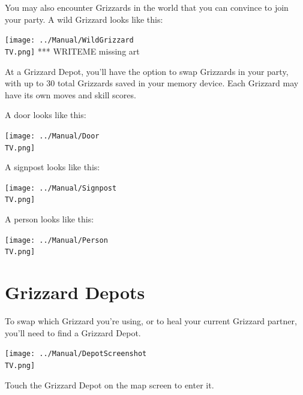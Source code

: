 \documentclass[10pt,twocolumn,openany,article]{memoir}
\newcommand\TV{NTSC}
\newcommand\TV{PAL}
\newcommand\TV{SECAM}
\begin{document}
\else

You may also  encounter Grizzards in the world that  you can convince to
join your party. A wild Grizzard looks like this:

\begin{center}
  \texttt{[image: ../Manual/WildGrizzard\\TV.png]}
  *** WRITEME missing art
\end{center}

At a  Grizzard Depot, you'll have  the option to swap  Grizzards in your
party,  with up  to  30 total  Grizzards saved  in  your memory  device.
Each Grizzard may have its own moves and skill scores.

\fi

A door looks like this:

\begin{center}
  \texttt{[image: ../Manual/Door\\TV.png]}
\end{center}

A signpost looks like this:

\begin{center}
  \texttt{[image: ../Manual/Signpost\\TV.png]}
\end{center}

A person looks like this:

\begin{center}
  \texttt{[image: ../Manual/Person\\TV.png]}
\end{center}

\section{Grizzard Depots}

To \ifdefined\NOSAVE\else  swap which  Grizzard you're using,  or to  \fi heal
your current Grizzard partner, you'll need to find a Grizzard Depot.

\texttt{[image: ../Manual/DepotScreenshot\\TV.png]}

Touch the Grizzard Depot on the map screen to enter it.
\end{document}
